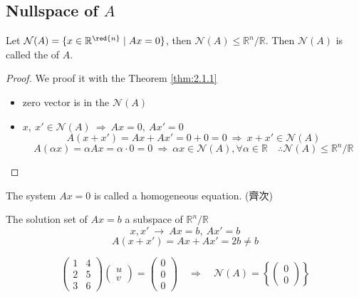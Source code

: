 
\subsection{Nullspace of $A$}

\begin{definition}
    Let $\mathcal{N}(A) = \{ x \in \mathbb{R}^{\red{n}} \;|\; Ax=0 \}$, then $\mathcal{N}(A) \leq \mathbb{R}^n / \mathbb{R}$. Then $\mathcal{N}(A)$ is called the  of $A$.
\end{definition}
\begin{proof}
    We proof it with the Theorem \ref{thm:2.1.1}
    \begin{itemize}
        \item zero vector is in the $\mathcal{N}(A)$
        \item $x,\ x' \in \mathcal{N}(A) \ \Rightarrow \ Ax = 0, \ Ax' = 0$
        \[
            A(x + x') = Ax + Ax' = 0 + 0 = 0 \ \Rightarrow \ x + x' \in \mathcal{N}(A)
        \]
        \[
            A(\alpha x) = \alpha A x = \alpha \cdot 0 = 0 \ \Rightarrow \ \alpha x \in \mathcal{N}(A), \forall \alpha \in \mathbb{R} \quad \therefore \mathcal{N}(A) \leq \mathbb{R}^n / \mathbb{R}
        \]
    \end{itemize}
\end{proof}

\begin{note}
The system $Ax = 0$ is called a homogeneous equation. (齊次)
\end{note}

\begin{remark}
    The solution set of $Ax = b$  a subspace of $\mathbb{R}^n / \mathbb{R}$
    \[
    x, x' \ \longrightarrow \ Ax = b, \ Ax' = b
    \]
    \[
    A(x + x') = Ax + Ax' = 2b \neq b
    \]
\end{remark}

\begin{eg}
\[
\begin{pmatrix}
    1 & 4 \\
    2 & 5 \\
    3 & 6
\end{pmatrix} \begin{pmatrix}
    u \\ v
\end{pmatrix} = \begin{pmatrix}
    0 \\ 0 \\ 0
\end{pmatrix} \quad \Longrightarrow \quad \mathcal{N}(A) = \left\{ \begin{pmatrix}
    0 \\ 0
\end{pmatrix} \right\}
\]
\end{eg}

